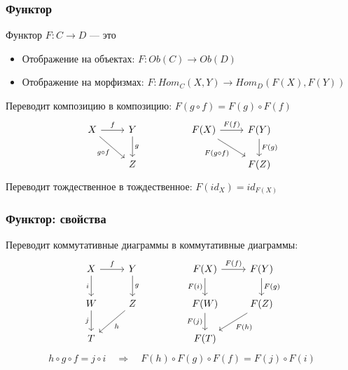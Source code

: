 \documentclass{beamer}
\begin{document}
\begin{frame}[fragile]
\frametitle{Функтор}
\begin{block}{Функтор \begin{math}F: C \rightarrow D\end{math} --- это}
\begin{itemize}
\pause
\item Отображение на объектах: \begin{math}F: Ob(C) \rightarrow Ob(D)\end{math}
\pause
\item Отображение на морфизмах: \begin{math}F: Hom_C(X,Y) \rightarrow Hom_D(F(X),F(Y))\end{math}
\end{itemize}
\end{block}
\pause
Переводит композицию в композицию: \begin{math}F(g\circ f) = F(g) \circ F(f)\end{math}
\pause
\begin{equation}
\begin{tikzcd}
X \arrow{r}{f} \arrow{rd}[swap]{g\circ f} & Y \arrow{d}{g} && F(X) \arrow{r}{F(f)} \arrow{rd}[swap]{F(g\circ f)} & F(Y) \arrow{d}{F(g)} \\
& Z &&& F(Z)
\end{tikzcd}
\end{equation}
\pause
Переводит тождественное в тождественное: \begin{math}F(id_X) = id_{F(X)}\end{math}
\end{frame}

\begin{frame}[fragile]
\frametitle{Функтор: свойства}
Переводит коммутативные диаграммы в коммутативные диаграммы:
\begin{equation}
\begin{tikzcd}
X \arrow{r}{f} \arrow{d}[swap]{i} & Y \arrow{d}{g} && F(X) \arrow{r}{F(f)} \arrow{d}[swap]{F(i)} & F(Y) \arrow{d}{F(g)} \\
W \arrow{d}[swap]{j} & Z \arrow{dl}{h} && F(W) \arrow{d}[swap]{F(j)} & F(Z) \arrow{dl}{F(h)} \\
T &&& F(T)
\end{tikzcd}
\end{equation}
\pause
\begin{equation}
h\circ g\circ f=j\circ i \quad \Longrightarrow \quad F(h)\circ F(g)\circ F(f) = F(j)\circ F(i)
\end{equation}
\end{frame}
\end{document}
